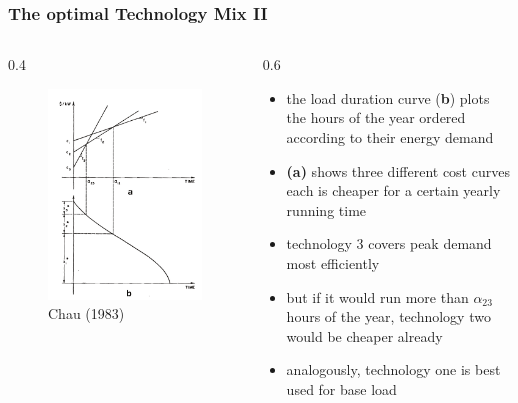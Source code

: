 			\begin{frame}

\frametitle{The optimal Technology Mix II}
\begin{columns}
\begin{column} {0.4\textwidth}

\begin{figure}[h]
\centering
\includegraphics[width=1.\textwidth]{capacity/technology_choice_sherali}
    \caption{Chau (1983)}
    \label{fig:Daten 2004}            
\end{figure}
\end{column}

\begin{column} {0.6\textwidth}
\begin{itemize}
\item the load duration curve (\textbf{b}) plots the hours of the year ordered according to their energy demand
\item \textbf{(a)} shows three different cost curves each is cheaper for a certain yearly running time
\item technology 3 covers peak demand most efficiently 
\item but if it would run more than $\alpha_{23}$ hours of the year, technology two would be cheaper already
\item analogously, technology one is best used for base load
\end {itemize}

\end{column}
\end{columns}


			\end{frame}	